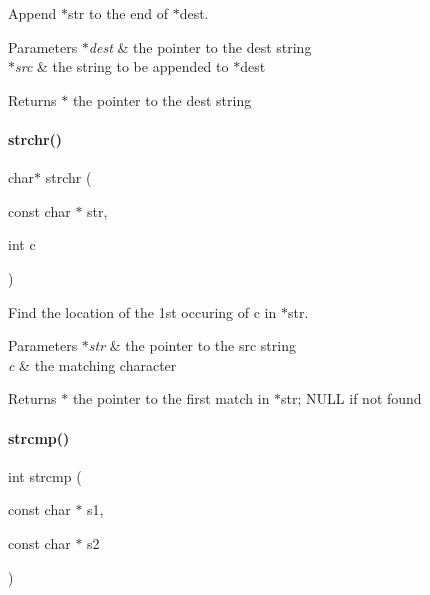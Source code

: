 Append $\ast$str to the end of $\ast$dest. 


\begin{DoxyParams}{Parameters}
{\em $\ast$dest} & the pointer to the dest string \\
\hline
{\em $\ast$src} & the string to be appended to $\ast$dest \\
\hline
\end{DoxyParams}
\begin{DoxyReturn}{Returns}
$\ast$ the pointer to the dest string 
\end{DoxyReturn}
\mbox{\label{a00038_afcd97f487174f9092b0f23c7ac78a55a}} 
\paragraph{\texorpdfstring{strchr()}{strchr()}}
{\footnotesize\ttfamily char$\ast$ strchr (\begin{DoxyParamCaption}\item[{const char $\ast$}]{str,  }\item[{int}]{c }\end{DoxyParamCaption})}



Find the location of the 1st occuring of c in $\ast$str. 


\begin{DoxyParams}{Parameters}
{\em $\ast$str} & the pointer to the src string \\
\hline
{\em c} & the matching character \\
\hline
\end{DoxyParams}
\begin{DoxyReturn}{Returns}
$\ast$ the pointer to the first match in $\ast$str; N\+U\+LL if not found 
\end{DoxyReturn}
\mbox{\label{a00038_a11bd144d7d44914099a3aeddf1c8567d}} 
\paragraph{\texorpdfstring{strcmp()}{strcmp()}}
{\footnotesize\ttfamily int strcmp (\begin{DoxyParamCaption}\item[{const char $\ast$}]{s1,  }\item[{const char $\ast$}]{s2 }\end{DoxyParamCaption})}



